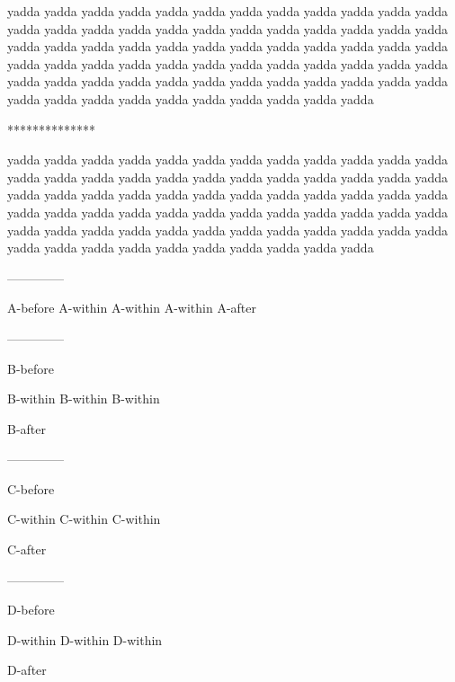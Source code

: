 yadda yadda yadda yadda yadda yadda yadda yadda yadda yadda
yadda yadda yadda yadda yadda yadda yadda yadda yadda yadda
yadda yadda yadda yadda yadda yadda yadda yadda yadda yadda
yadda yadda yadda yadda yadda yadda yadda yadda yadda yadda
yadda yadda yadda yadda yadda yadda yadda yadda yadda yadda
yadda yadda yadda yadda yadda yadda yadda yadda yadda yadda
yadda yadda yadda yadda yadda yadda yadda yadda yadda yadda\par
**************


yadda yadda yadda yadda yadda yadda yadda yadda yadda yadda
yadda yadda yadda yadda yadda yadda yadda yadda yadda yadda
yadda yadda yadda yadda yadda yadda yadda yadda yadda yadda
yadda yadda yadda yadda yadda yadda yadda yadda yadda yadda
yadda yadda yadda yadda yadda yadda yadda yadda yadda yadda
yadda yadda yadda yadda yadda yadda yadda yadda yadda yadda
yadda yadda yadda yadda yadda yadda yadda yadda yadda yadda\par
{}


--------------


A-before
\begingroup\obeyalllines{}A-within
A-within
A-within
\endgroup{}A-after\par
--------------


B-before\par

\begingroup\obeyalllines{}B-within
B-within
B-within
\endgroup{}\par

B-after\par
--------------


C-before
\begingroup\obeyalllines{}\par

C-within
C-within
C-within\par

\endgroup{}C-after\par
--------------


D-before\par

\begingroup\obeyalllines{}\par

D-within
D-within
D-within\par

\endgroup{}\par

D-after\par